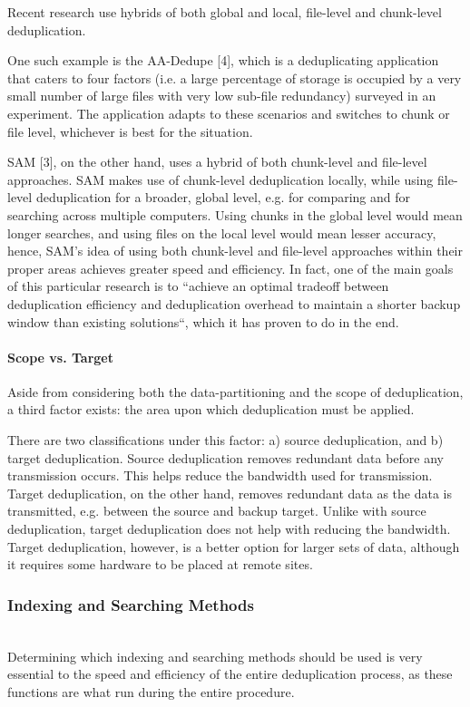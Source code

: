\documentclass[journal]{IEEEtran}
\begin{document}
Recent research use hybrids of both global and local, file-level and chunk-level deduplication. 

One such example is the AA-Dedupe [4], which is a deduplicating application that caters to four factors (i.e. a large percentage of storage is occupied by a very small number of large files with very low sub-file redundancy) surveyed in an experiment. The application adapts to these scenarios and switches to chunk or file level, whichever is best for the situation.

SAM [3], on the other hand, uses a hybrid of both chunk-level and file-level approaches. SAM makes use of chunk-level deduplication locally, while using file-level deduplication for a broader, global level, e.g. for comparing and for searching across multiple computers. Using chunks in the global level would mean longer searches, and using files on the local level would mean lesser accuracy, hence, SAM’s idea of using both chunk-level and file-level approaches within their proper areas achieves greater speed and efficiency. In fact, one of the main goals of this particular research is to “achieve an optimal tradeoff between deduplication efficiency and deduplication overhead to maintain a shorter backup window than existing solutions“, which it has proven to do in the end.

\paragraph{Scope vs. Target}

Aside from considering both the data-partitioning and the scope of deduplication, a third factor exists: the area upon which deduplication must be applied. 

There are two classifications under this factor: a) source deduplication, and b) target deduplication. Source deduplication removes redundant data before any transmission occurs. This helps reduce the bandwidth used for transmission. Target deduplication, on the other hand, removes redundant data as the data is transmitted, e.g. between the source and backup target. Unlike with source deduplication, target deduplication does not help with reducing the bandwidth. Target deduplication, however, is a better option for larger sets of data, although it requires some hardware to be placed at remote sites.
\\
\subsubsection{Indexing and Searching Methods}
\\
Determining which indexing and searching methods should be used is very essential to the speed and efficiency of the entire deduplication process, as these functions are what run during the entire procedure.
\end{document}
